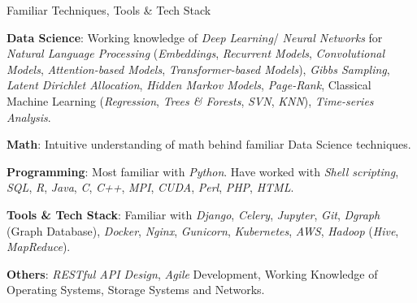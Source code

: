 \documentclass{resume} %
\begin{document}
\begin{rSection}{Familiar Techniques, Tools \& Tech Stack}

\begin{rTechExpertiseList}
\item {\bf Data Science}: Working knowledge of {\em Deep Learning}/ {\em Neural Networks} for {\em Natural Language Processing} ({\em Embeddings}, {\em Recurrent Models}, {\em Convolutional Models}, {\em Attention-based Models}, {\em Transformer-based Models}), {\em Gibbs Sampling}, {\em Latent Dirichlet Allocation}, {\em Hidden Markov Models}, {\em Page-Rank}, Classical Machine Learning ({\em Regression}, {\em Trees \& Forests}, {\em SVN}, {\em KNN}), {\em Time-series Analysis}.
\item{\bf Math}: Intuitive understanding of math behind familiar Data Science techniques.
\item {\bf Programming}: Most familiar with {\em Python}. Have worked with {\em Shell scripting}, {\em SQL}, {\em R}, {\em Java}, {\em C}, {\em C++}, {\em MPI}, {\em CUDA}, {\em Perl}, {\em PHP}, {\em HTML}.
\item {\bf Tools \& Tech Stack}: Familiar with {\em Django}, {\em Celery}, {\em Jupyter}, {\em Git}, {\em Dgraph} (Graph Database), {\em Docker}, {\em Nginx}, {\em Gunicorn}, {\em Kubernetes}, {\em AWS}, {\em Hadoop} ({\em Hive}, {\em MapReduce}).
\item {\bf Others}: {\em RESTful API Design}, {\em Agile} Development, Working Knowledge of Operating Systems, Storage Systems and Networks.
\end{rTechExpertiseList}

\end{rSection}




   
\end{document}
